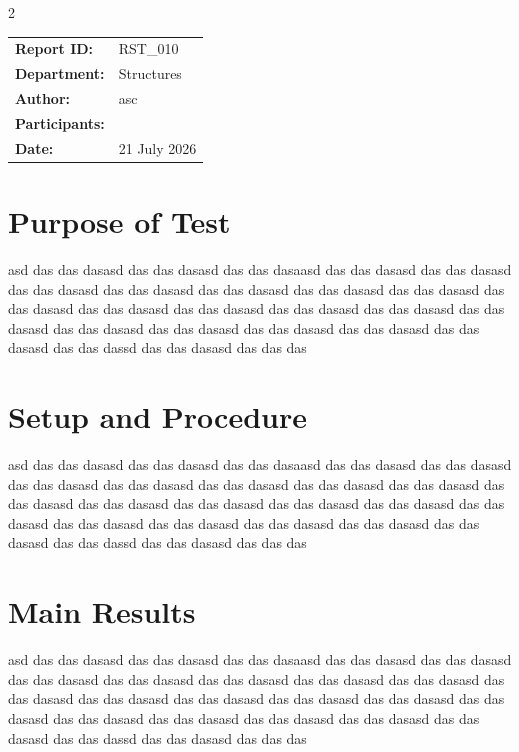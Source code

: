 \documentclass[11pt,a4paper]{article}
\begin{document}
\begin{multicols}{2}

\small
\renewcommand{\arraystretch}{1.1}

\begin{tabular}{
    @{}
    >{\bfseries}p{2.1cm}
    p{\dimexpr\columnwidth-2.1cm\relax}
    @{}
}
Report ID: &
RST\_010 \\

Department: &
Structures \\

Author: &
asc \\

Participants: &
 \\

Date: &
21 July 2026 \\
\end{tabular}

\normalsize
\vspace{0.4em}

\section*{Purpose of Test}
asd das das dasasd das das dasasd das das dasaasd das das dasasd das das dasasd das das dasasd das das dasasd das das dasasd das das dasasd das das dasasd das das dasasd das das dasasd das das dasasd das das dasasd das das dasasd das das dasasd das das dasasd das das dasasd das das dasasd das das dasasd das das dasasd das das dassd das das dasasd das das das

\section*{Setup and Procedure}
asd das das dasasd das das dasasd das das dasaasd das das dasasd das das dasasd das das dasasd das das dasasd das das dasasd das das dasasd das das dasasd das das dasasd das das dasasd das das dasasd das das dasasd das das dasasd das das dasasd das das dasasd das das dasasd das das dasasd das das dasasd das das dasasd das das dassd das das dasasd das das das

\section*{Main Results}
asd das das dasasd das das dasasd das das dasaasd das das dasasd das das dasasd das das dasasd das das dasasd das das dasasd das das dasasd das das dasasd das das dasasd das das dasasd das das dasasd das das dasasd das das dasasd das das dasasd das das dasasd das das dasasd das das dasasd das das dasasd das das dasasd das das dassd das das dasasd das das das


\end{multicols}
\end{document}
